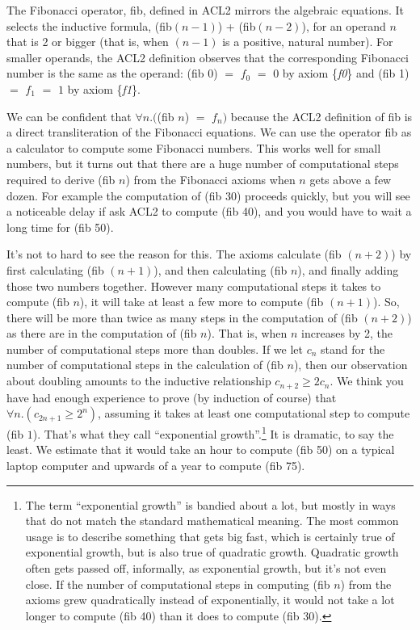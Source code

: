The Fibonacci operator, fib, defined in ACL2
mirrors the algebraic equations.
It selects the inductive formula,
(fib$(n - 1)$) + (fib$(n - 2)$),
for an operand $n$ that is 2 or bigger
(that is, when $(n-1)$ is a positive, natural number).
For smaller operands, the ACL2 definition
observes that the corresponding Fibonacci number
is the same as the operand:
(fib 0) $=$ $f_0$ $=$ $0$ by axiom \{\emph{f0}\}
and (fib 1) $=$ $f_1$ $=$ $1$ by axiom \{\emph{f1}\}.

We can be confident that $\forall n.($(fib $n$) $=$ $f_n)$
because the ACL2 definition of fib is a direct
transliteration of the Fibonacci equations.
We can use the operator fib as a calculator
to compute some Fibonacci numbers.
This works well for small numbers,
but it turns out that there are
a huge number of
computational steps required to derive
(fib $n$) from the Fibonacci axioms when $n$ gets above a few dozen.
For example the computation of (fib 30) proceeds quickly,
but you will see a noticeable delay if ask ACL2 to compute (fib 40),
and you would have to wait a long time for (fib 50).

It's not to hard to see the reason for this.
The axioms calculate (fib $(n+2)$) by first calculating
(fib $(n+1)$), and then calculating (fib $n$), and finally
adding those two numbers together.
However many computational steps it takes to compute (fib $n$),
it will take at least a few more to compute (fib $(n+1)$).
So, there will be more than twice as many steps in the computation of (fib $(n+2)$)
as there are in the computation of (fib $n$).
That is, when $n$ increases by 2, the number of computational steps more than doubles.
If we let $c_n$ stand for the number of computational steps in the calculation
of (fib $n$), then our observation about doubling amounts to the
inductive relationship $c_{n+2} \geq 2c_n$.
We think you have had enough experience to prove (by induction of course)
that $\forall n.(c_{2n+1} \geq 2^n)$,
assuming it takes at least one computational step to compute (fib $1$).
That's what they call ``exponential growth''.\footnote{The term
``exponential growth'' is bandied about a lot, but mostly
in ways that do not match the standard mathematical meaning.
The most common usage is to describe something that
gets big fast, which is certainly true of exponential growth,
but is also true of quadratic growth.
Quadratic growth often gets passed off, informally, as exponential growth,
but it's not even close. If the number of computational steps
in computing (fib $n$) from the axioms grew quadratically instead of exponentially,
it would not take a lot longer to compute (fib 40) than it does to compute (fib 30).}
It is dramatic, to say the least. We estimate that it would take an hour to compute
(fib 50) on a typical laptop computer and upwards of a year to compute (fib 75).

